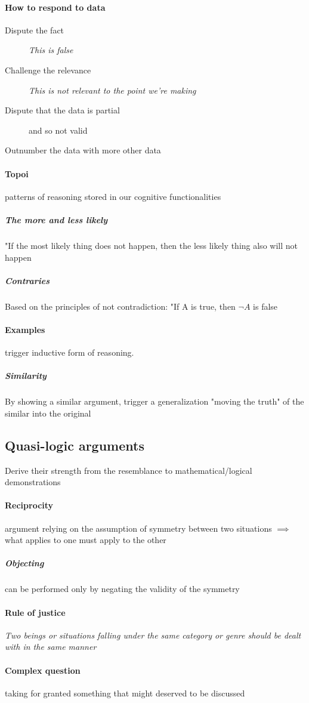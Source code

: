 \documentclass{article}
\begin{document}
\paragraph{How to respond to data}
\begin{description}
	\item[Dispute the fact] \textit{This is false}
	\item[Challenge the relevance] \textit{This is not relevant to the point we're making}
	\item[Dispute that the data is partial] and so not valid
	\item[Outnumber the data with more other data]
\end{description}
\paragraph{Topoi} patterns of reasoning stored in our cognitive functionalities
\subparagraph{The more and less likely} "If the most likely thing does not happen, then the less likely thing also will not happen
\subparagraph{Contraries} Based on the principles of not contradiction: "If A is true, then $\neg A$ is false
\paragraph{Examples} trigger inductive form of reasoning. 
\subparagraph{Similarity} By showing a similar argument, trigger a generalization "moving the truth" of the similar into the original
\subsection{Quasi-logic arguments}
Derive their strength from the resemblance to mathematical/logical demonstrations
\paragraph{Reciprocity} argument relying on the assumption of symmetry between two situations $\implies$ what applies to one must apply to the other
\subparagraph{Objecting} can be performed only by negating the validity of the symmetry
\paragraph{Rule of justice} \textit{Two beings or situations falling under the same category or genre should be dealt with in the same manner}
\paragraph{Complex question} taking for granted something that might deserved to be discussed
\end{document}
